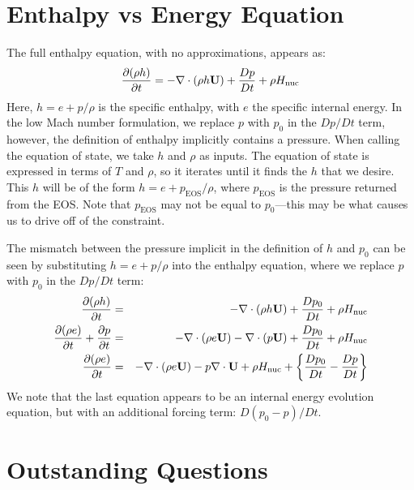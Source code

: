 \section{Enthalpy vs Energy Equation}

The full enthalpy equation, with no approximations, appears as:
\begin{equation}
\frac{\partial(\rho h)}{\partial t} = -\nabla\cdot(\rho h{\bf U}) + 
  \frac{Dp}{Dt} + \rho{H_{\rm nuc}} \label{eq:enthalpy}
\end{equation}
Here, $h = e + p/\rho$ is the specific enthalpy, with $e$ the specific
internal energy.  In the low Mach number formulation, we replace $p$
with $p_0$ in the $Dp/Dt$ term, however, the definition of enthalpy
implicitly contains a pressure.  When calling the equation of state,
we take $h$ and $\rho$ as inputs.  The equation of state is expressed
in terms of $T$ and $\rho$, so it iterates until it finds the $h$ that
we desire.  This $h$ will be of the form $h = e + p_\mathrm{EOS}/\rho$,
where $p_\mathrm{EOS}$ is the pressure returned from the EOS.  Note that
$p_\mathrm{EOS}$ may not be equal to $p_0$---this may be what
causes us to drive off of the constraint. 

The mismatch between the pressure implicit in the definition of $h$
and $p_0$ can be seen by substituting $h = e + p/\rho$ into the
enthalpy equation, where we replace $p$ with $p_0$ in the $Dp/Dt$ term:
\begin{eqnarray}
\frac{\partial(\rho h)}{\partial t} &=& -\nabla\cdot(\rho h\Ub) + 
  \frac{Dp_0}{Dt} + \rho\Hnuc \nonumber \\
%
\frac{\partial(\rho e)}{\partial t} + \frac{\partial p}{\partial t} &=&
 -\nabla\cdot(\rho e\Ub) -\nabla\cdot(p\Ub) + \frac{Dp_0}{Dt} + \rho\Hnuc \nonumber \\
%
\frac{\partial(\rho e)}{\partial t} &=&
 -\nabla\cdot(\rho e\Ub) - p\nabla\cdot\Ub + \rho\Hnuc + 
  \left \{ \frac{Dp_0}{Dt} - \frac{Dp}{Dt} \right \} \nonumber 
\end{eqnarray}
We note that the last equation appears to be an internal energy
evolution equation, but with an additional forcing term: $D(p_0 - p)/Dt$.

\section{Outstanding Questions}

